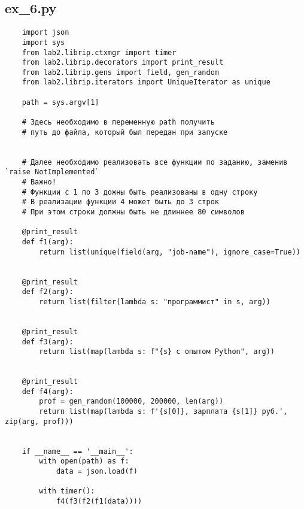 \documentclass{article}
\begin{document}
\subsection{ex\_6.py}
\begin{verbatim}
    import json
    import sys
    from lab2.librip.ctxmgr import timer
    from lab2.librip.decorators import print_result
    from lab2.librip.gens import field, gen_random
    from lab2.librip.iterators import UniqueIterator as unique
    
    path = sys.argv[1]
    
    # Здесь необходимо в переменную path получить
    # путь до файла, который был передан при запуске
    
    
    # Далее необходимо реализовать все функции по заданию, заменив `raise NotImplemented`
    # Важно!
    # Функции с 1 по 3 дожны быть реализованы в одну строку
    # В реализации функции 4 может быть до 3 строк
    # При этом строки должны быть не длиннее 80 символов
    
    @print_result
    def f1(arg):
        return list(unique(field(arg, "job-name"), ignore_case=True))
    
    
    @print_result
    def f2(arg):
        return list(filter(lambda s: "программист" in s, arg))
    
    
    @print_result
    def f3(arg):
        return list(map(lambda s: f"{s} с опытом Python", arg))
    
    
    @print_result
    def f4(arg):
        prof = gen_random(100000, 200000, len(arg))
        return list(map(lambda s: f'{s[0]}, зарплата {s[1]} руб.', zip(arg, prof)))
    
    
    if __name__ == '__main__':
        with open(path) as f:
            data = json.load(f)
    
        with timer():
            f4(f3(f2(f1(data))))
\end{verbatim}
\end{document}
